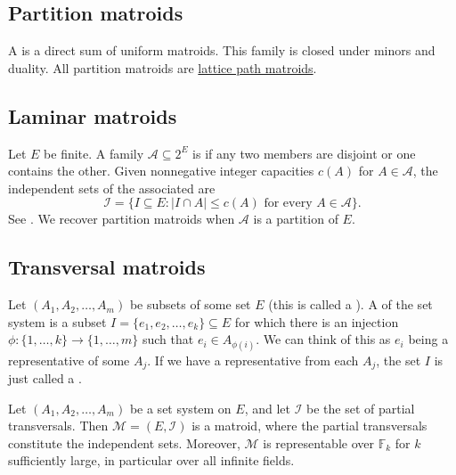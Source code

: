 \subsection[partitionMatroids]{Partition matroids}

A \label{partitionMatroid} is a direct sum of uniform
matroids.  This family is closed under minors and duality.  All partition
matroids are \hyperref[latticePathMatroids]{lattice path matroids}.


\subsection[laminarMatroids]{Laminar matroids}

Let $E$ be finite. A family $\mathcal A\subseteq 2^E$ is
\label{laminarFamily} if any two members are disjoint or one
contains the other. Given nonnegative integer capacities $c(A)$ for
$A\in\mathcal A$, the independent sets of the associated
\label{laminarMatroid} are
\[
  \mathcal I=\{I\subseteq E: |I\cap A|\leq c(A)
    \text{ for every } A\in\mathcal A\}.
\]
See \cite{FifeOxley2017}. We recover partition matroids when $\mathcal A$
is a partition of $E$.


\subsection[transversalMatroids]{Transversal matroids}

\begin{definition}
Let $(A_1,A_2,\dotsc,A_m)$ be subsets of some set $E$ (this is called a
\label{setSystem}).
A \label{partialTransversal} of the set system is a
subset $I=\{e_1,e_2,\dotsc,e_k\} \subseteq E$ for which there is an injection
$\phi:\{1,\dotsc,k\}\to\{1,\dotsc,m\}$ such that $e_i \in A_{\phi(i)}$.
We can think of this as $e_i$ being a representative of some $A_j$.
If we have a representative from each $A_j$, the set $I$ is just called a
\label{transversal}.
\end{definition}

\begin{theorem}
Let $(A_1,A_2,\dotsc,A_m)$ be a set system on $E$, and let $\mathcal{I}$ be
the set of partial transversals.
Then $\mathcal{M} = (E,\mathcal{I})$ is a matroid, where the partial
transversals constitute the independent sets.
Moreover, $\mathcal{M}$ is representable over $\mathbb{F}_k$ for $k$
sufficiently large,
in particular over all infinite fields.
\end{theorem}

